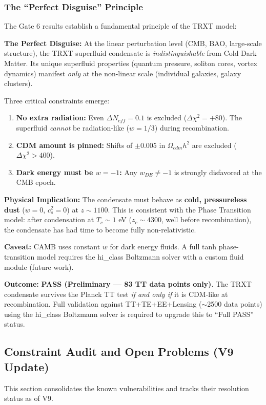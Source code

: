 \documentclass[a4paper,12pt]{article}
\begin{document}
\subsubsection{The ``Perfect Disguise'' Principle}

The Gate 6 results establish a fundamental principle of the TRXT model:

\begin{mdframed}[backgroundcolor=blue!5]
\textbf{The Perfect Disguise:} At the linear perturbation level (CMB, BAO, large-scale structure), the TRXT superfluid condensate is \textit{indistinguishable} from Cold Dark Matter. Its unique superfluid properties (quantum pressure, soliton cores, vortex dynamics) manifest \textit{only} at the non-linear scale (individual galaxies, galaxy clusters).
\end{mdframed}

Three critical constraints emerge:
\begin{enumerate}
    \item \textbf{No extra radiation:} Even $\Delta N_{eff} = 0.1$ is excluded ($\Delta\chi^2 = +80$). The superfluid \textit{cannot} be radiation-like ($w = 1/3$) during recombination.
    \item \textbf{CDM amount is pinned:} Shifts of $\pm 0.005$ in $\Omega_{cdm} h^2$ are excluded ($\Delta\chi^2 > 400$).
    \item \textbf{Dark energy must be $w = -1$:} Any $w_{DE} \neq -1$ is strongly disfavored at the CMB epoch.
\end{enumerate}

\textbf{Physical Implication:} The condensate must behave as \textbf{cold, pressureless dust} ($w = 0$, $c_s^2 = 0$) at $z \sim 1100$. This is consistent with the Phase Transition model: after condensation at $T_c \sim 1$ eV ($z_c \sim 4300$, well before recombination), the condensate has had time to become fully non-relativistic.

\textbf{Caveat:} CAMB uses constant $w$ for dark energy fluids. A full tanh phase-transition model requires the hi\_class Boltzmann solver with a custom fluid module (future work).

\textbf{Outcome:} \textbf{PASS (Preliminary --- 83 TT data points only)}. The TRXT condensate survives the Planck TT test \textit{if and only if} it is CDM-like at recombination. Full validation against TT+TE+EE+Lensing ($\sim$2500 data points) using the hi\_class Boltzmann solver is required to upgrade this to ``Full PASS'' status.

\subsection{Constraint Audit and Open Problems (V9 Update)}
This section consolidates the known vulnerabilities and tracks their resolution status as of V9.
\end{document}
